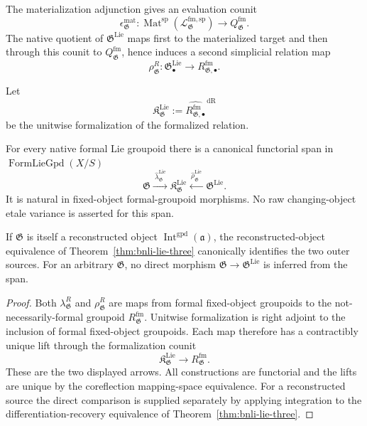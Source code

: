 The materialization adjunction gives an evaluation counit
\[
    \epsilon_{\mathfrak G}^{\mathrm{mat}}:
    \operatorname{Mat}^{\mathrm{sp}}
    \left(
      \mathcal L_{\mathfrak G}^{\mathrm{fm,sp}}
    \right)
    \longrightarrow
    Q_{\mathfrak G}^{\mathrm{fm}}.
\]
The native quotient of $\mathfrak G^{\mathrm{Lie}}$ maps first to the
materialized target and then through this counit to
$Q_{\mathfrak G}^{\mathrm{fm}}$, hence induces a second simplicial relation map
\[
    \rho^R_{\mathfrak G}:
    \mathfrak G^{\mathrm{Lie}}_\bullet
    \longrightarrow
    R_{\mathfrak G,\bullet}^{\mathrm{fm}}.
\]

\begin{definition}
\label{def:bnli-lie-comparison-object}
Let
\[
\boxed{
    \mathfrak K_{\mathfrak G}^{\mathrm{Lie}}
    :=
    \widehat{
      R_{\mathfrak G,\bullet}^{\mathrm{fm}}
    }^{\,\mathrm{dR}}}
\]
be the unitwise formalization of the formalized relation.
\end{definition}

\begin{theorem}
\label{thm:bnli-completion-map}
For every native formal Lie groupoid there is a canonical functorial span in
$\operatorname{FormLieGpd}(X/S)$
\[
\boxed{
    \mathfrak G
    \xrightarrow{\ \widehat\lambda^{\mathrm{Lie}}_{\mathfrak G}\ }
    \mathfrak K_{\mathfrak G}^{\mathrm{Lie}}
    \xleftarrow{\ \widehat\rho^{\mathrm{Lie}}_{\mathfrak G}\ }
    \mathfrak G^{\mathrm{Lie}}.}
\]
It is natural in fixed-object formal-groupoid morphisms.  No raw
changing-object etale variance is asserted for this span.

If $\mathfrak G$ is itself a reconstructed object
$\operatorname{Int}^{\mathrm{gpd}}(\mathfrak a)$, the reconstructed-object
equivalence of Theorem~\ref{thm:bnli-lie-three} canonically identifies the two
outer sources.  For an arbitrary $\mathfrak G$, no direct morphism
$\mathfrak G\to\mathfrak G^{\mathrm{Lie}}$ is inferred from the span.
\end{theorem}

\begin{proof}
Both $\lambda^R_{\mathfrak G}$ and $\rho^R_{\mathfrak G}$ are maps from formal
fixed-object groupoids to the not-necessarily-formal groupoid
$R_{\mathfrak G}^{\mathrm{fm}}$.  Unitwise formalization is right adjoint to the
inclusion of formal fixed-object groupoids.  Each map therefore has a
contractibly unique lift through the formalization counit
\[
    \mathfrak K_{\mathfrak G}^{\mathrm{Lie}}
    \longrightarrow
    R_{\mathfrak G}^{\mathrm{fm}}.
\]
These are the two displayed arrows.  All constructions are functorial and the
lifts are unique by the coreflection mapping-space equivalence.  For a reconstructed source the direct comparison is supplied separately by
applying integration to the differentiation-recovery equivalence of
Theorem~\ref{thm:bnli-lie-three}.
\end{proof}

